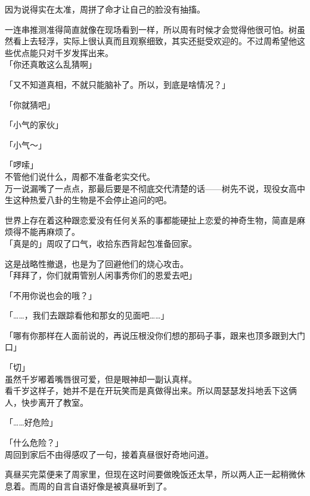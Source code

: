 因为说得实在太准，周拼了命才让自己的脸没有抽搐。

一连串推测准得简直就像在现场看到一样，所以周有时候才会觉得他很可怕。树虽然看上去轻浮，实际上很认真而且观察细致，其实还挺受欢迎的。不过周希望他这些优点能只对千岁发挥出来。\\

「你还真敢这么乱猜啊」

「又不知道真相，不就只能脑补了。所以，到底是啥情况？」

「你就猜吧」

「小气的家伙」

「小气～」

「啰嗦」\\

不管他们说什么，周都不准备老实交代。\\

万一说漏嘴了一点点，那最后要是不彻底交代清楚的话——树先不说，现役女高中生这种热爱八卦的生物是不会停止追问的吧。

世界上存在着这种跟恋爱没有任何关系的事都能硬扯上恋爱的神奇生物，简直是麻烦得不能再麻烦了。\\

「真是的」周叹了口气，收拾东西背起包准备回家。

这是战略性撤退，也是为了回避他们的烧心攻击。\\

「拜拜了，你们就甭管别人闲事秀你们的恩爱去吧」

「不用你说也会的哦？」

「……，我们去跟踪看他和那女的见面吧……」

「哪有你那样在人面前说的，再说压根没你们想的那码子事，跟来也顶多跟到大门口」

「切」\\

虽然千岁嘟着嘴唇很可爱，但是眼神却一副认真样。\\

看千岁这样子，她并不是在开玩笑而是真做得出来。所以周瑟瑟发抖地丢下这俩人，快步离开了教室。\\

\vspace{2\baselineskip}

「……好危险」

「什么危险？」\\

周回到家后不由得感叹了一句，接着真昼很好奇地问道。

真昼买完菜便来了周家里，但现在这时间要做晚饭还太早，所以两人正一起稍微休息着。而周的自言自语好像是被真昼听到了。\\

